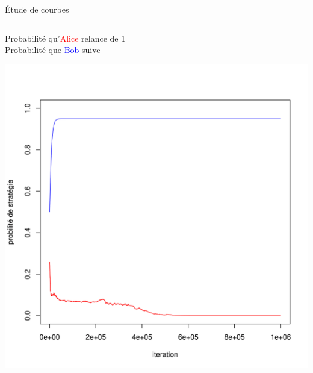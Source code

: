 \begin{frame}{Étude de courbes}
\begin{columns}
        \begin{column}{0.5 \textwidth}
        \begin{small}
        \hspace{-0.24 cm} Probabilité qu'\textcolor{red}{Alice} relance de 1 \\ Probabilité que \textcolor{blue}{Bob} suive\\
        \end{small}
        \centering
            \includegraphics[width =\textwidth]{Images/Courbes/LRI/Relance1.png}
       
    
        \end{column}
       

\end{columns}
\end{frame}
